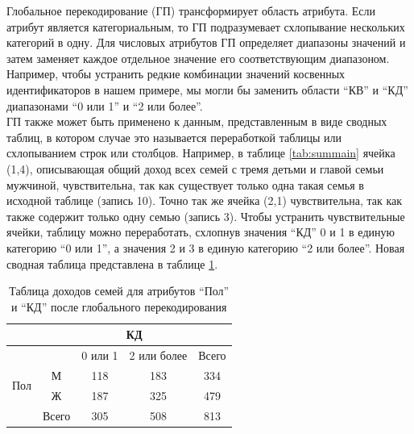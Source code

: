 Глобальное перекодирование (ГП) трансформирует область атрибута. Если атрибут является категориальным, то ГП подразумевает схлопывание нескольких категорий в одну. Для числовых атрибутов ГП определяет диапазоны значений и затем заменяет каждое отдельное значение его соответствующим диапазоном. Например, чтобы устранить редкие комбинации значений косвенных идентификаторов в нашем примере, мы могли бы заменить области \enquote{КВ} и \enquote{КД} диапазонами \enquote{0 или 1} и \enquote{2 или более}.
\\

ГП также может быть применено к данным, представленным в виде сводных таблиц, в котором случае это называется переработкой таблицы или схлопыванием строк или столбцов. Например, в таблице \ref{tab:summain} ячейка (1,4), описывающая общий доход всех семей с тремя детьми и главой семьи мужчиной, чувствительна, так как существует только одна такая семья в исходной таблице (запись 10). Точно так же ячейка (2,1) чувствительна, так как также содержит только одну семью (запись 3). Чтобы устранить чувствительные ячейки, таблицу можно переработать, схлопнув значения \enquote{КД} 0 и 1 в единую категорию \enquote{0 или 1}, а значения 2 и 3 в единую категорию \enquote{2 или более}. Новая сводная таблица представлена в таблице \ref{tab:GP}.
\\

\begin{table}[h]
\centering
\begin{tabular}{|c|cccc|}
\hline
                        & \multicolumn{4}{c|}{КД}                                                                \\ \hline
\multirow{4}{*}{Пол} & \multicolumn{1}{c|}{}      & \multicolumn{1}{c|}{0 или 1} & \multicolumn{1}{c|}{2 или более} & Всего \\ \cline{2-5} 
& \multicolumn{1}{c|}{М}     & \multicolumn{1}{c|}{118}     & \multicolumn{1}{c|}{183}         & 334   \\ \cline{2-5} 
                        & \multicolumn{1}{c|}{Ж}     & \multicolumn{1}{c|}{187}     & \multicolumn{1}{c|}{325}         & 479   \\ \cline{2-5} 
                        & \multicolumn{1}{c|}{Всего} & \multicolumn{1}{c|}{305}     & \multicolumn{1}{c|}{508}         & 813   \\ \hline
\end{tabular}
\caption{Таблица доходов семей для атрибутов \enquote{Пол} и \enquote{КД} после глобального перекодирования}
\label{tab:GP}
\end{table}


